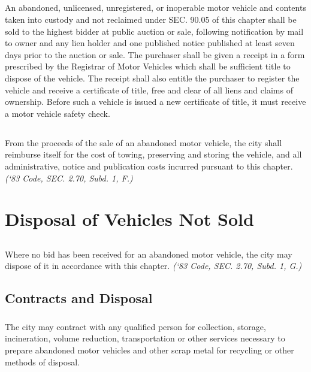\documentclass[code.tex]{subfiles}
\begin{document}
\subsection{}
An abandoned, unlicensed, unregistered, or inoperable motor vehicle and contents taken into custody and not reclaimed under SEC. 90.05 of this chapter shall be sold to the highest bidder at public auction or sale, following notification by mail to owner and any lien holder and one published notice published at least seven days prior to the auction or sale. The purchaser shall be given a receipt in a form prescribed by the Registrar of Motor Vehicles which shall be sufficient title to dispose of the vehicle. The receipt shall also entitle the purchaser to register the vehicle and receive a certificate of title, free and clear of all liens and claims of ownership.  Before such a vehicle is issued a new certificate of title, it must receive a motor vehicle safety check.
\subsection{}
From the proceeds of the sale of an abandoned motor vehicle, the city shall reimburse itself for the cost of towing, preserving and storing the vehicle, and all administrative, notice and publication costs incurred pursuant to this chapter.\\
\emph{(‘83 Code, SEC. 2.70, Subd. 1, F.)}

\section{Disposal of Vehicles Not Sold}
\subsection{}
Where no bid has been received for an abandoned motor vehicle, the city may dispose of it in accordance with this chapter. \emph{(‘83 Code, SEC. 2.70, Subd. 1, G.)}
\subsection{Contracts and Disposal}
\subsubsection{}
The city may contract with any qualified person for collection, storage, incineration, volume reduction, transportation or other services necessary to prepare abandoned motor vehicles and other scrap metal for recycling or other methods of disposal.
\end{document}
